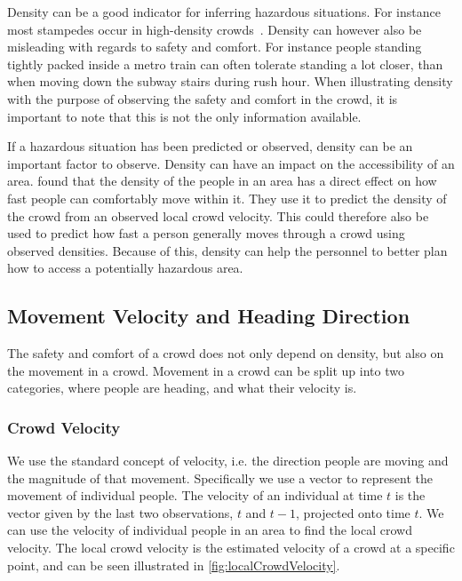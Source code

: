 Density can be a good indicator for inferring hazardous situations. For instance most stampedes occur in high-density crowds~\cite{wirz2012inferring}. Density can however also be misleading with regards to safety and comfort. For instance people standing tightly packed inside a metro train can often tolerate standing a lot closer, than when moving down the subway stairs during rush hour. When illustrating density with the purpose of observing the safety and comfort in the crowd, it is important to note that this is not the only information available.

If a hazardous situation has been predicted or observed, density can be an important factor to observe. Density can have an impact on the accessibility of an area. \citet{wirz2013probing} found that the density of the people in an area has a direct effect on how fast people can comfortably move within it. They use it to predict the density of the crowd from an observed local crowd velocity. This could therefore also be used to predict how fast a person generally moves through a crowd using observed densities. Because of this, density can help the personnel to better plan how to access a potentially hazardous area.

\subsection{Movement Velocity and Heading Direction}
The safety and comfort of a crowd does not only depend on density, but also on the movement in a crowd. Movement in a crowd can be split up into two categories, where people are heading, and what their velocity is.

\subsubsection{Crowd Velocity}
We use the standard concept of velocity, i.e. the direction people are moving and the magnitude of that movement. Specifically we use a vector to represent the movement of individual people. The velocity of an individual at time $t$ is the vector given by the last two observations, $t$ and $t-1$, projected onto time $t$. We can use the velocity of individual people in an area to find the local crowd velocity. The local crowd velocity is the estimated velocity of a crowd at a specific point, and can be seen illustrated in \cref{fig:localCrowdVelocity}.

